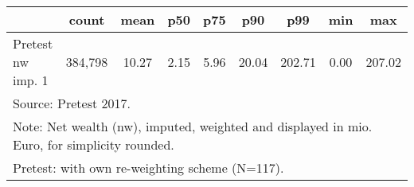 {
\def\sym#1{\ifmmode^{#1}\else\(^{#1}\)\fi}
\begin{tabular}{l*{1}{cccccccc}}
\hline\hline
                                            &       count&        mean&         p50&         p75&         p90&         p99&         min&         max\\
\hline
Pretest nw imp. 1                           &     384,798&       10.27&        2.15&        5.96&       20.04&      202.71&        0.00&      207.02\\
\hline\hline
\multicolumn{9}{l}{\footnotesize Source: Pretest 2017.}\\
\multicolumn{9}{l}{\footnotesize Note: Net wealth (nw), imputed, weighted and displayed in mio. Euro, for simplicity rounded.}\\
\multicolumn{9}{l}{\footnotesize Pretest: with own re-weighting scheme (N=117).}\\
\end{tabular}
}
